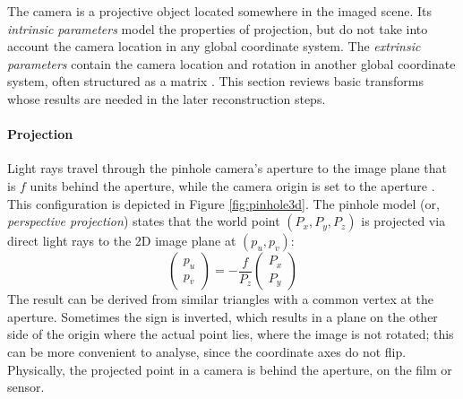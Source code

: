
The camera is a projective object located somewhere in the imaged scene.
Its \emph{intrinsic parameters} model the properties of projection, but do not take into account the camera location in any global coordinate system.
The \emph{extrinsic parameters} contain the camera location and rotation in another global coordinate system, often structured as a matrix \cite[p. 41]{hartley03multiview}. %
This section reviews basic transforms whose results are needed in the later reconstruction steps.


\paragraph{Projection}
Light rays travel through the pinhole camera's aperture to the image plane that is $f$ units behind the aperture, while the camera origin is set to the aperture \cite{hartley03multiview}.
This configuration is depicted in Figure \ref{fig:pinhole3d}.
The pinhole model (or, \emph{perspective projection}) states that the world point $(P_x, P_y, P_z)$ is projected via direct light rays to the 2D image plane at $(p_u, p_v)$:
\begin{equation}
\begin{pmatrix}
p_u \\ p_v
\end{pmatrix}
=
-\frac{f}{P_z} \begin{pmatrix}
P_x \\ P_y
\end{pmatrix}
\end{equation}
The result can be derived from similar triangles with a common vertex at the aperture.
Sometimes the sign is inverted, which results in a plane on the other side of the origin where the actual point lies, where the image is not rotated; this can be more convenient to analyse, since the coordinate axes do not flip.
Physically, the projected point in a camera is behind the aperture, on the film or sensor.

